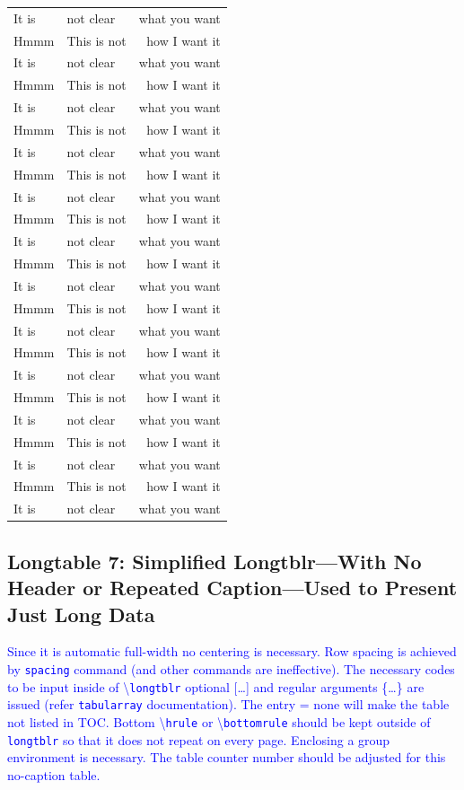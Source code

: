 \documentclass[phd]{ndsu-thesis-2022}
\newcommand\italk[1]{\textcolor{blue}{#1}}  %
\newcommand\cmd[1]{\textbackslash\texttt{#1}}  %
\newcommand\vb[1]{\textcolor{blue}{\texttt{#1}}}%
\begin{document}
\begin{longtable}{l @{\hspace{2cm}} l @{\hspace{1.5cm}} r}
It is   & not clear     & what you want \\
Hmmm    & This is not   & how I want it \\
It is   & not clear     & what you want \\
Hmmm    & This is not   & how I want it \\
It is   & not clear     & what you want \\
Hmmm    & This is not   & how I want it \\
It is   & not clear     & what you want \\
Hmmm    & This is not   & how I want it \\
It is   & not clear     & what you want \\
Hmmm    & This is not   & how I want it \\
It is   & not clear     & what you want \\
Hmmm    & This is not   & how I want it \\
It is   & not clear     & what you want \\
Hmmm    & This is not   & how I want it \\
It is   & not clear     & what you want \\
Hmmm    & This is not   & how I want it \\
It is   & not clear     & what you want \\
Hmmm    & This is not   & how I want it \\
It is   & not clear     & what you want \\
Hmmm    & This is not   & how I want it \\
It is   & not clear     & what you want \\
Hmmm    & This is not   & how I want it \\
It is   & not clear     & what you want \\
\end{longtable}
\endgroup
\addtocounter{table}{-1}%

\kant[9]

\subsection{Longtable 7: Simplified Longtblr---With No Header or Repeated Caption---Used to Present Just Long Data}

\italk{Since it is automatic full-width no centering is necessary. Row spacing is achieved by \texttt{spacing} command (and other commands are ineffective). The necessary codes to be input inside of \cmd{longtblr} optional [\ldots] and regular arguments \{\ldots\} are issued (refer \texttt{tabularray} documentation). The entry = none will make the table not listed in TOC. Bottom \cmd{hrule} or \cmd{bottomrule} should be kept outside of \vb{longtblr} so that it does not repeat on every page. Enclosing a group environment is necessary. The table counter number should be adjusted for this no-caption table.}
\end{document}
